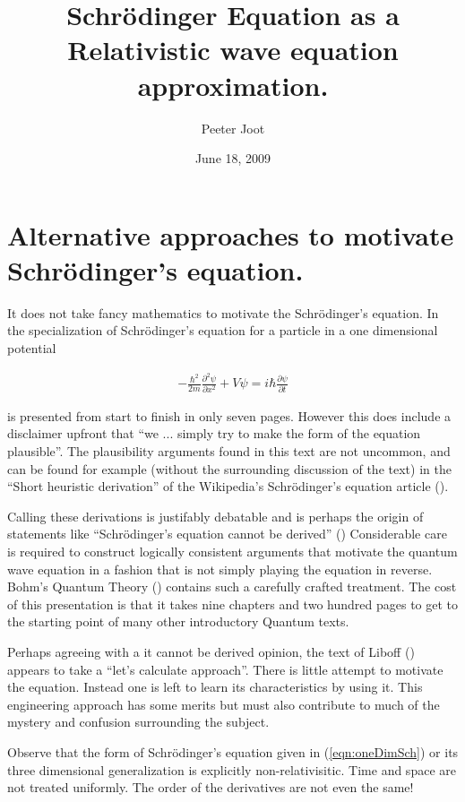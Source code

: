 \documentclass[]{eliblog}
\title{Schr\"{o}dinger Equation as a Relativistic wave equation approximation.}
\author{Peeter Joot}
\date{June 18, 2009}
\begin{document}
\maketitle

\section{Alternative approaches to motivate Schr\"{o}dinger's equation.}

It does not take fancy mathematics to motivate the Schr\"{o}dinger's equation.  In
\cite{french1998iqp} the specialization of Schr\"{o}dinger's equation for a 
particle in a one dimensional potential

\begin{align}\label{eqn:oneDimSch}
-\frac{\hbar^2}{2m} \frac{\partial^2 \psi}{\partial x^2} + V\psi = i \hbar \frac{\partial \psi}{\partial t}
\end{align}

is presented from start to finish in only seven pages.  However this does include a disclaimer upfront that
``we ... simply try to make the form of the equation plausible''.  The plausibility arguments
found in this text are not uncommon, and can be found for example (without the surrounding discussion of the text) 
in the ``Short heuristic derivation'' of the Wikipedia's Schr\"{o}dinger's equation article (\cite{wikiSchH}).

Calling these derivations is justifably debatable and is perhaps the origin of statements like
``Schr\"{o}dinger's equation cannot be derived'' (\cite{hyperphysicsSch})
Considerable care 
is required to construct logically consistent arguments that motivate the quantum wave
equation in a fashion that is not simply playing the equation in reverse.  Bohm's Quantum Theory
(\cite{bohm1989qt}) contains such a carefully crafted treatment.  The cost 
of this presentation
is that it takes nine chapters and two hundred pages to get to
the starting point of many other introductory Quantum texts.

Perhaps agreeing with a it cannot be derived opinion, the text of Liboff (\cite{liboff2003iqm}) appears to take a 
``let's calculate approach''.  There is little attempt to motivate the equation.  Instead one is left to learn
its characteristics by using it.  This engineering approach has some merits but must also contribute to much of the mystery
and confusion surrounding the subject.

Observe that the form of Schr\"{o}dinger's equation given in (\ref{eqn:oneDimSch}) or its three dimensional generalization is
explicitly non-relativisitic.  Time and space are not treated uniformly.  The order of the derivatives are not
even the same!
\end{document}

